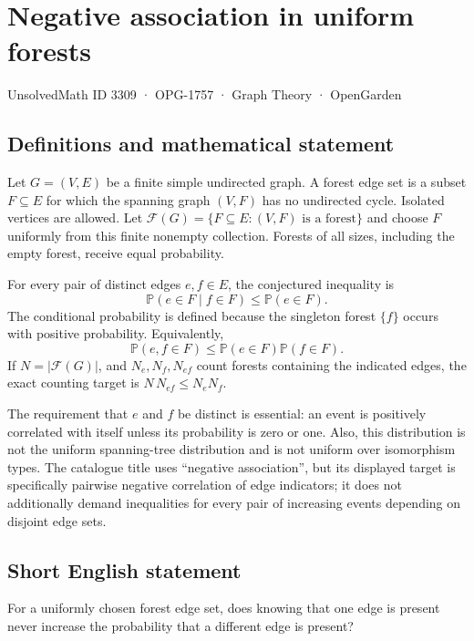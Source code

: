 \documentclass[11pt,a4paper]{article}
\begin{document}
\section*{Negative association in uniform forests}\label{3309}
{\small UnsolvedMath ID 3309 · OPG-1757 · Graph Theory · OpenGarden}
\subsection{Definitions and mathematical statement}
Let $G=(V,E)$ be a finite simple undirected graph. A forest edge set
is a subset $F\subseteq E$ for which the spanning graph $(V,F)$ has
no undirected cycle. Isolated vertices are allowed. Let
$\mathcal F(G)=\{F\subseteq E:(V,F)\text{ is a forest}\}$ and choose
$F$ uniformly from this finite nonempty collection. Forests of all
sizes, including the empty forest, receive equal probability.

For every pair of distinct edges $e,f\in E$, the conjectured inequality
is
\[
                  \mathbb P(e\in F\mid f\in F)
                              \le\mathbb P(e\in F).
\]
The conditional probability is defined because the singleton forest
$\{f\}$ occurs with positive probability. Equivalently,
\[
            \mathbb P(e,f\in F)\le
                         \mathbb P(e\in F)\mathbb P(f\in F).
\]
If $N=|\mathcal F(G)|$, and $N_e,N_f,N_{ef}$ count forests containing
the indicated edges, the exact counting target is
$N\,N_{ef}\le N_eN_f$.

The requirement that $e$ and $f$ be distinct is essential: an event is
positively correlated with itself unless its probability is zero or
one. Also, this distribution is not the uniform spanning-tree
distribution and is not uniform over isomorphism types. The catalogue
title uses ``negative association'', but its displayed target is
specifically pairwise negative correlation of edge indicators; it
does not additionally demand inequalities for every pair of increasing
events depending on disjoint edge sets.
\subsection{Short English statement}
For a uniformly chosen forest edge set, does knowing that one edge is present never increase the probability that a different edge is present?
\end{document}
